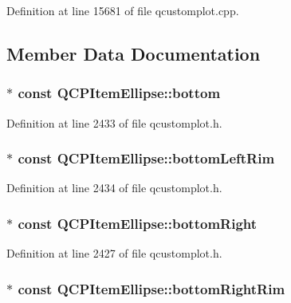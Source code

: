 Definition at line 15681 of file qcustomplot.\-cpp.



\subsection{Member Data Documentation}
\hypertarget{class_q_c_p_item_ellipse_a2dc80ff9f5db600eae0133bdde65066f}{
\subsubsection[{bottom}]{$\ast$ const Q\-C\-P\-Item\-Ellipse\-::bottom}}\label{class_q_c_p_item_ellipse_a2dc80ff9f5db600eae0133bdde65066f}


Definition at line 2433 of file qcustomplot.\-h.

\hypertarget{class_q_c_p_item_ellipse_a31f31a9e9f9098c90fb47573094276c5}{
\subsubsection[{bottom\-Left\-Rim}]{$\ast$ const Q\-C\-P\-Item\-Ellipse\-::bottom\-Left\-Rim}}\label{class_q_c_p_item_ellipse_a31f31a9e9f9098c90fb47573094276c5}


Definition at line 2434 of file qcustomplot.\-h.

\hypertarget{class_q_c_p_item_ellipse_ab73c8deafc0d8d1ef7d75b6cdcc37159}{
\subsubsection[{bottom\-Right}]{$\ast$ const Q\-C\-P\-Item\-Ellipse\-::bottom\-Right}}\label{class_q_c_p_item_ellipse_ab73c8deafc0d8d1ef7d75b6cdcc37159}


Definition at line 2427 of file qcustomplot.\-h.

\hypertarget{class_q_c_p_item_ellipse_a5c8404be601d61b7fafeaaf1c05c4c42}{
\subsubsection[{bottom\-Right\-Rim}]{$\ast$ const Q\-C\-P\-Item\-Ellipse\-::bottom\-Right\-Rim}}\label{class_q_c_p_item_ellipse_a5c8404be601d61b7fafeaaf1c05c4c42}


